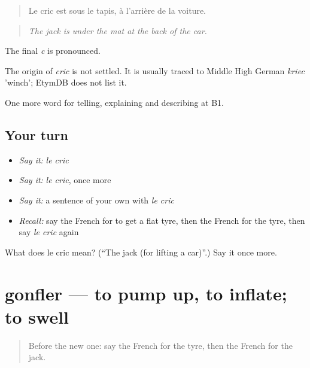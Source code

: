 \begin{quote}
Le cric est sous le tapis, à l'arrière de la voiture.
\end{quote}

\begin{quote}
\emph{The jack is under the mat at the back of the car.}
\end{quote}

The final \emph{c} is pronounced.

\begin{cousinweb}
The origin of \emph{cric} is not settled. It is usually traced to Middle High German \emph{kriec} 'winch'; EtymDB does not list it.
\end{cousinweb}

\begin{grammarlens}[title={What you've built}]
One more word for telling, explaining and describing at B1.
\end{grammarlens}

\subsection*{Your turn}
\begin{itemize}
\raggedright
  \item \emph{Say it:} \emph{le cric}
  \item \emph{Say it:} \emph{le cric}, once more
  \item \emph{Say it:} a sentence of your own with \emph{le cric}
  \item \emph{Recall:} say the French for to get a flat tyre, then the French for the tyre, then say \emph{le cric} again
\end{itemize}

\begin{tcolorbox}[breakable,colback=teal!4,colframe=teal!35!black,title={Before you move on}]
What does le cric mean? (\textquotedblleft{}The jack (for lifting a car)\textquotedblright{}.) Say it once more.
\end{tcolorbox}
\section[gonfler]{gonfler — to pump up, to inflate; to swell}

\label{lesson:FR-C404-gonfler}



\begin{quote}
Before the new one: say the French for the tyre, then the French for the jack.
\end{quote}

